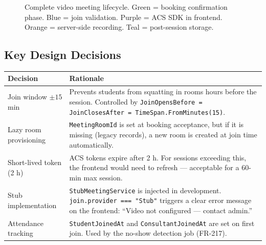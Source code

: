 \documentclass[11pt,a4paper]{article}
\begin{document}
\begin{figure}[H]
\caption{Complete video meeting lifecycle.
  \colorbox{spLightGreen!60}{Green} = booking confirmation phase.
  \colorbox{spLightBlue!60}{Blue} = join validation.
  \colorbox{spLightPurple!60}{Purple} = ACS SDK in frontend.
  \colorbox{spLightOrange!60}{Orange} = server-side recording.
  \colorbox{spLightTeal!60}{Teal} = post-session storage.}
\end{figure}

\subsection{Key Design Decisions}

\begin{center}
\begin{tabular}{lp{10.5cm}}
\toprule
\textbf{Decision} & \textbf{Rationale}\\
\midrule
Join window $\pm15$ min &
  Prevents students from squatting in rooms hours before the session.
  Controlled by \texttt{JoinOpensBefore = JoinClosesAfter = TimeSpan.FromMinutes(15)}.\\[4pt]
Lazy room provisioning &
  \texttt{MeetingRoomId} is set at booking acceptance, but if it is missing
  (legacy records), a new room is created at join time automatically.\\[4pt]
Short-lived token (2 h) &
  ACS tokens expire after 2 h. For sessions exceeding this,
  the frontend would need to refresh --- acceptable for a 60-min max session.\\[4pt]
Stub implementation &
  \texttt{StubMeetingService} is injected in development.
  \texttt{join.provider === "Stub"} triggers a clear error message on the
  frontend: ``Video not configured --- contact admin.''\\[4pt]
Attendance tracking &
  \texttt{StudentJoinedAt} and \texttt{ConsultantJoinedAt} are set on first join.
  Used by the no-show detection job (FR-217).\\
\bottomrule
\end{tabular}
\end{center}
\end{document}
